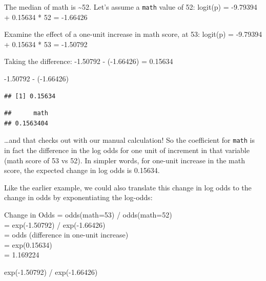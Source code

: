 \documentclass[
]{article}
\newenvironment{Shaded}{\begin{snugshade}}{\end{snugshade}}
\newcommand{\CommentTok}[1]{\textcolor[rgb]{0.56,0.35,0.01}{\textit{#1}}}
\newcommand{\DecValTok}[1]{\textcolor[rgb]{0.00,0.00,0.81}{#1}}
\newcommand{\FloatTok}[1]{\textcolor[rgb]{0.00,0.00,0.81}{#1}}
\newcommand{\FunctionTok}[1]{\textcolor[rgb]{0.00,0.00,0.00}{#1}}
\newcommand{\NormalTok}[1]{#1}
\newcommand{\SpecialCharTok}[1]{\textcolor[rgb]{0.00,0.00,0.00}{#1}}
\begin{document}
The median of math is \textasciitilde52. Let's assume a \texttt{math}
value of 52: logit(p) = -9.79394 + 0.15634 * 52 = -1.66426

Examine the effect of a one-unit increase in math score, at 53: logit(p)
= -9.79394 + 0.15634 * 53 = -1.50792

Taking the difference: -1.50792 - (-1.66426) = 0.15634

\begin{Shaded}
\begin{Highlighting}[]
\SpecialCharTok{{-}}\FloatTok{1.50792} \SpecialCharTok{{-}}\NormalTok{ (}\SpecialCharTok{{-}}\FloatTok{1.66426}\NormalTok{)}
\end{Highlighting}
\end{Shaded}

\begin{verbatim}
## [1] 0.15634
\end{verbatim}

\begin{Shaded}
\end{Shaded}

\begin{verbatim}
##      math 
## 0.1563404
\end{verbatim}

\ldots and that checks out with our manual calculation! So the
coefficient for \texttt{math} is in fact the difference in the log odds
for one unit of increment in that variable (math score of 53 vs 52). In
simpler words, for one-unit increase in the math score, the expected
change in log odds is 0.15634.

Like the earlier example, we could also translate this change in log
odds to the change in odds by exponentiating the log-odds:

Change in Odds = odds(math=53) / odds(math=52)\\
= exp(-1.50792) / exp(-1.66426)\\
= odds (difference in one-unit increase)\\
= exp(0.15634)\\
= 1.169224

\begin{Shaded}
\begin{Highlighting}[]
\FunctionTok{exp}\NormalTok{(}\SpecialCharTok{{-}}\FloatTok{1.50792}\NormalTok{) }\SpecialCharTok{/} \FunctionTok{exp}\NormalTok{(}\SpecialCharTok{{-}}\FloatTok{1.66426}\NormalTok{)}
\end{Highlighting}
\end{Shaded}
\end{document}
